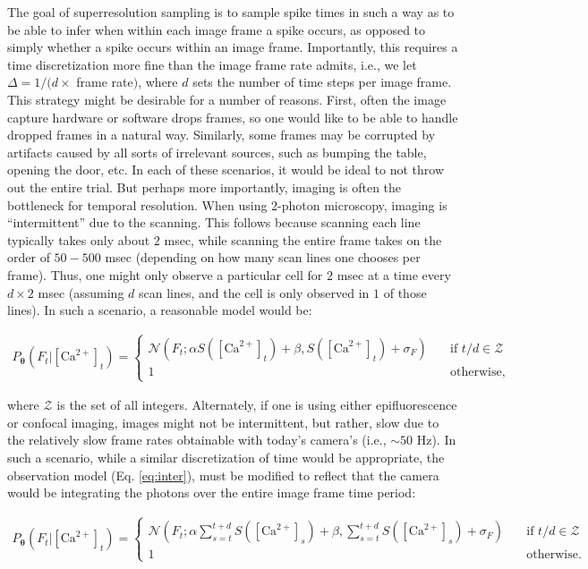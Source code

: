 \documentclass[12pt]{article}
\providecommand{\ve}[1]{\boldsymbol{#1}}
\providecommand{\ve}[1]{\boldsymbol{#1}}
\newcommand{\thetn}{\ve{\theta}}
\newcommand{\p}{P_{\thetn}}
\newcommand{\Ca}{[\text{Ca}^{2+}]}
\begin{document}
The goal of superresolution sampling is to sample spike times in such a way as to be able to infer when within each image frame a spike occurs, as opposed to simply whether a spike occurs within an image frame.  Importantly, this requires a time discretization more fine than the image frame rate admits, i.e., we let $\Delta=1/(d \times$ frame rate$)$, where $d$ sets the number of time steps per image frame. This strategy might be desirable for a number of reasons.  First, often the image capture hardware or software drops frames, so one would like to be able to handle dropped frames in a natural way.  Similarly, some frames may be corrupted by artifacts caused by all sorts of irrelevant sources, such as bumping the table, opening the door, etc.  In each of these scenarios, it would be ideal to not throw out the entire trial.  But perhaps more importantly, imaging is often the bottleneck for temporal resolution.  When using 2-photon microscopy, imaging is ``intermittent'' due to the scanning. This follows because scanning each line typically takes only about $2$ msec, while scanning the entire frame takes on the order of $50-500$ msec (depending on how many scan lines one chooses per frame). Thus, one might only observe a particular cell for $2$ msec at a time every $d \times 2$ msec (assuming $d$ scan lines, and the cell is only observed in $1$ of those lines).  In such a scenario, a reasonable model would be:

\begin{align}\label{eq:inter}
\p(F_t|\Ca_t)  =
\begin{cases}
\mathcal{N}(F_t; \alpha  S(\Ca_t) + \beta, S(\Ca_t) + \sigma_F) &\quad \text{if } t/d \in \mathcal{Z}\\
1 &\quad \text{otherwise,}
\end{cases}
\end{align} 

\noindent where $\mathcal{Z}$ is the set of all integers.  Alternately, if one is using either epifluorescence or confocal imaging, images might not be intermittent, but rather, slow due to the relatively slow frame rates obtainable with today's camera's (i.e., $\sim 50$ Hz).  In such a scenario, while a similar discretization of time would be appropriate, the observation model (Eq. \ref{eq:inter}), must be modified to reflect that the camera would be integrating the photons over the entire image frame time period:

\begin{align}\label{eq:epi}
\p(F_t|\Ca_t) =
\begin{cases}
\mathcal{N}(F_t; \alpha  \sum_{s=t}^{t+d} S(\Ca_s) + \beta, \sum_{s=t}^{t+d} S(\Ca_s) + \sigma_F) &\quad \text{if } t/d \in \mathcal{Z}\\
1 &\quad \text{otherwise.}
\end{cases}
\end{align} 
\end{document}
